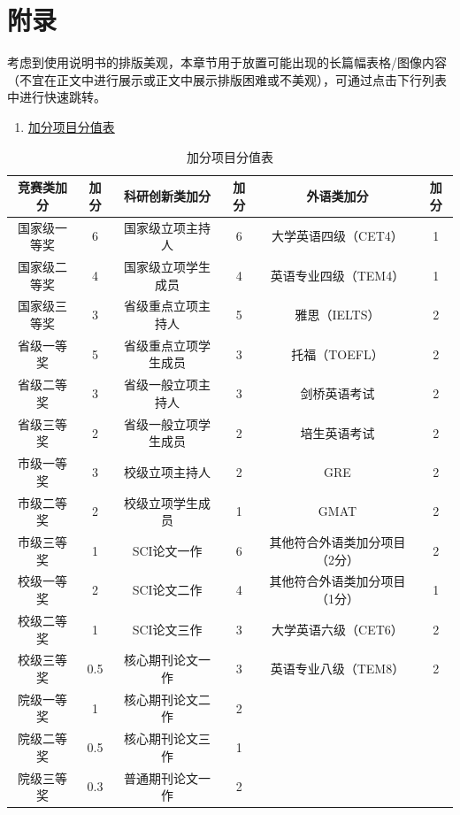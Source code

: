 \documentclass[12pt]{report}
\begin{document}
	\chapter{附录}
	考虑到使用说明书的排版美观，本章节用于放置可能出现的长篇幅表格/图像内容（不宜在正文中进行展示或正文中展示排版困难或不美观），可通过点击下行列表中进行快速跳转。
	
	\begin{enumerate}
		\item \hyperref[分值表]{加分项目分值表}
	\end{enumerate}
	
	
	\begin{table}[htbp]
	\centering
	\small
	\renewcommand{\arraystretch}{1} %
	\caption{加分项目分值表}
	\begin{tabular}{cccccc}
		\toprule%
		\textbf{竞赛类加分} & \textbf{加分} & \textbf{科研创新类加分} & \textbf{加分} & \textbf{外语类加分} & \textbf{加分} \\  \midrule%
		国家级一等奖 & 6 & 国家级立项主持人 & 6 & 大学英语四级（CET4） & 1 \\ 
		国家级二等奖 & 4 & 国家级立项学生成员 & 4 & 英语专业四级（TEM4） & 1 \\ 
		国家级三等奖 & 3 & 省级重点立项主持人 & 5 & 雅思（IELTS） & 2 \\ 
		省级一等奖 & 5 & 省级重点立项学生成员 & 3 & 托福（TOEFL） & 2 \\ 
		省级二等奖 & 3 & 省级一般立项主持人 & 3 & 剑桥英语考试 & 2 \\ 
		省级三等奖 & 2 & 省级一般立项学生成员 & 2 & 培生英语考试 & 2 \\
		市级一等奖 & 3 & 校级立项主持人 & 2 & GRE & 2 \\ 
		市级二等奖 & 2 & 校级立项学生成员 & 1 & GMAT & 2 \\ 
		市级三等奖 & 1 & SCI论文一作 & 6 & 其他符合外语类加分项目（2分） & 2 \\
		校级一等奖 & 2 & SCI论文二作 & 4 & 其他符合外语类加分项目（1分） & 1 \\
		校级二等奖 & 1 & SCI论文三作 & 3 & 大学英语六级（CET6） & 2 \\ 
		校级三等奖 & 0.5 & 核心期刊论文一作 & 3 & 英语专业八级（TEM8） & 2 \\ 
		院级一等奖 & 1 & 核心期刊论文二作 & 2 & & \\ 
		院级二等奖 & 0.5 & 核心期刊论文三作 & 1 & & \\ 
		院级三等奖 & 0.3 & 普通期刊论文一作 & 2 & & \\ 

\end{tabular}
\end{table}
\end{document}
